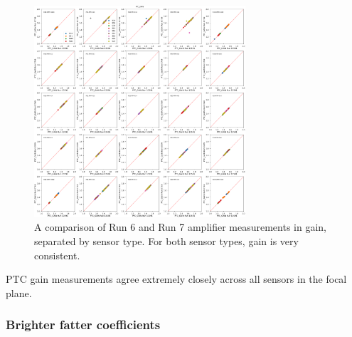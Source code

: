 \begin{figure}[H]
\begin{centering}
\includegraphics[width=0.7\textwidth]{figures/baselineCharacterization/13591_E749_PTC_GAIN.png}
\caption{A comparison of Run 6 and Run 7 amplifier measurements in gain, separated by sensor type. For both sensor types, gain is very consistent.}
\end{centering}
\end{figure}

PTC gain measurements agree extremely closely across all sensors in the
focal plane.

\subsubsection{Brighter fatter coefficients}\label{brighter-fatter-a00-coefficient}


